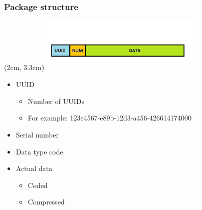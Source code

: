 \documentclass{beamer}
\begin{document}
\begin{frame}
    \frametitle{Package structure}
    \begin{textblock*}{5cm}(2cm, 3.3cm) %
        \includegraphics[width=8cm]{pics/Package structure.png}
    \end{textblock*}
    \begin{itemize}
        \item UUID
            \begin{itemize}
                \item Number of UUIDs
                \item For example:  123e4567-e89b-12d3-a456-426614174000
            \end{itemize}
        \item Serial number
        \item Data type code
        \item Actual data
            \begin{itemize}
                \item Coded
                \item Compressed
            \end{itemize}
    \end{itemize}
\end{frame}



\end{document}
